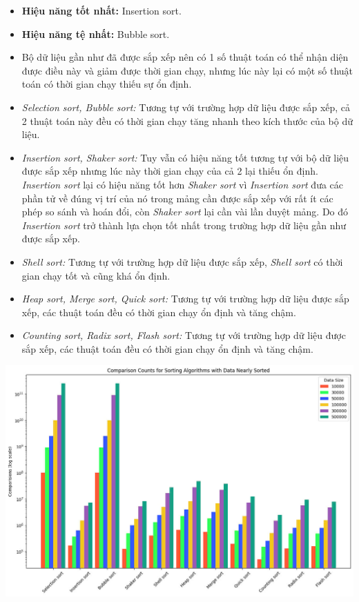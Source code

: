 \begin{itemize}
    \item \textbf{Hiệu năng tốt nhất:} Insertion sort.
    \item \textbf{Hiệu năng tệ nhất:} Bubble sort.
    \item Bộ dữ liệu gần như đã được sắp xếp nên có 1 số thuật toán có thể nhận diện được điều này và giảm được thời gian chạy, nhưng lúc này lại có một số thuật toán có thời gian chạy thiếu sự ổn định.
    \item \textit{Selection sort, Bubble sort:} Tương tự với trường hợp dữ liệu được sắp xếp, cả 2 thuật toán này đều có thời gian chạy tăng nhanh theo kích thước của bộ dữ liệu.
    \item \textit{Insertion sort, Shaker sort:} Tuy vẫn có hiệu năng tốt tương tự với bộ dữ liệu được sắp xếp nhưng lúc này thời gian chạy của cả 2 lại thiếu ổn định. \textit{Insertion sort} lại có hiệu năng tốt hơn \textit{Shaker sort} vì \textit{Insertion sort} đưa các phần tử về đúng vị trí của nó trong mảng cần được sắp xếp với rất ít các phép so sánh và hoán đổi, còn \textit{Shaker sort} lại cần vài lần duyệt mảng. Do đó \textit{Insertion sort} trở thành lựa chọn tốt nhất trong trường hợp dữ liệu gần như được sắp xếp.
    \item \textit{Shell sort:} Tương tự với trường hợp dữ liệu được sắp xếp, \textit{Shell sort} có thời gian chạy tốt và cũng khá ổn định.
    \item \textit{Heap sort, Merge sort, Quick sort:} Tương tự với trường hợp dữ liệu được sắp xếp, các thuật toán đều có thời gian chạy ổn định và tăng chậm.
    \item \textit{Counting sort, Radix sort, Flash sort:} Tương tự với trường hợp dữ liệu được sắp xếp, các thuật toán đều có thời gian chạy ổn định và tăng chậm.
\end{itemize}

\newpage
\includegraphics[width = 1\linewidth]{img/experiment/comparison/COMPARISON_NEARLY.jpg}
